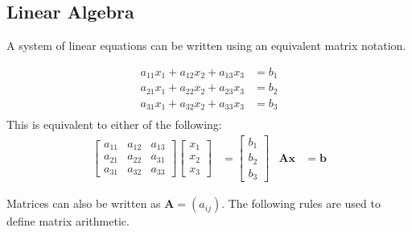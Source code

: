 \documentclass[crop=false,class=book,oneside]{standalone}
\begin{document}
        \subsection{Linear Algebra}
            A system of linear equations can be written
            using an equivalent matrix notation.
            \begin{example}
                \begin{align*}
                    a_{11}x_{1}+a_{12}x_{2}+a_{13}x_{3}&=b_{1}\\
                    a_{21}x_{1}+a_{22}x_{2}+a_{23}x_{3}&=b_{2}\\
                    a_{31}x_{1}+a_{32}x_{2}+a_{33}x_{3}&=b_{3}\\
                \end{align*}
                This is equivalent to either of the following:
                \begin{align*}
                    \begin{bmatrix}
                        a_{11}&a_{12}&a_{13}\\
                        a_{21}&a_{22}&a_{31}\\
                        a_{31}&a_{32}&a_{33}
                    \end{bmatrix}
                    \begin{bmatrix}
                        x_{1}\\
                        x_{2}\\
                        x_{3}
                    \end{bmatrix}
                    &=
                    \begin{bmatrix}
                        b_{1}\\
                        b_{2}\\
                        b_{3}
                    \end{bmatrix}
                    &
                    \mathbf{A}\mathbf{x}
                    &=\mathbf{b}
                \end{align*}
            \end{example}
            Matrices can also be written as $\mathbf{A}=(a_{ij})$.
            The following rules are used to
            define matrix arithmetic.
\end{document}
